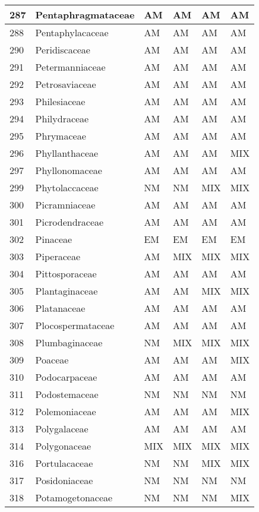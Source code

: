 \documentclass[]{article}
\begin{document}
\begin{longtable}{l|l|l|l|l|l}
\hline
287 & Pentaphragmataceae & AM & AM & AM & AM\\
\hline
288 & Pentaphylacaceae & AM & AM & AM & AM\\
\hline
290 & Peridiscaceae & AM & AM & AM & AM\\
\hline
291 & Petermanniaceae & AM & AM & AM & AM\\
\hline
292 & Petrosaviaceae & AM & AM & AM & AM\\
\hline
293 & Philesiaceae & AM & AM & AM & AM\\
\hline
294 & Philydraceae & AM & AM & AM & AM\\
\hline
295 & Phrymaceae & AM & AM & AM & AM\\
\hline
296 & Phyllanthaceae & AM & AM & AM & MIX\\
\hline
297 & Phyllonomaceae & AM & AM & AM & AM\\
\hline
299 & Phytolaccaceae & NM & NM & MIX & MIX\\
\hline
300 & Picramniaceae & AM & AM & AM & AM\\
\hline
301 & Picrodendraceae & AM & AM & AM & AM\\
\hline
302 & Pinaceae & EM & EM & EM & EM\\
\hline
303 & Piperaceae & AM & MIX & MIX & MIX\\
\hline
304 & Pittosporaceae & AM & AM & AM & AM\\
\hline
305 & Plantaginaceae & AM & AM & MIX & MIX\\
\hline
306 & Platanaceae & AM & AM & AM & AM\\
\hline
307 & Plocospermataceae & AM & AM & AM & AM\\
\hline
308 & Plumbaginaceae & NM & MIX & MIX & MIX\\
\hline
309 & Poaceae & AM & AM & AM & MIX\\
\hline
310 & Podocarpaceae & AM & AM & AM & AM\\
\hline
311 & Podostemaceae & NM & NM & NM & NM\\
\hline
312 & Polemoniaceae & AM & AM & AM & MIX\\
\hline
313 & Polygalaceae & AM & AM & AM & AM\\
\hline
314 & Polygonaceae & MIX & MIX & MIX & MIX\\
\hline
316 & Portulacaceae & NM & NM & MIX & MIX\\
\hline
317 & Posidoniaceae & NM & NM & NM & NM\\
\hline
318 & Potamogetonaceae & NM & NM & NM & MIX\\

\end{longtable}
\end{document}
